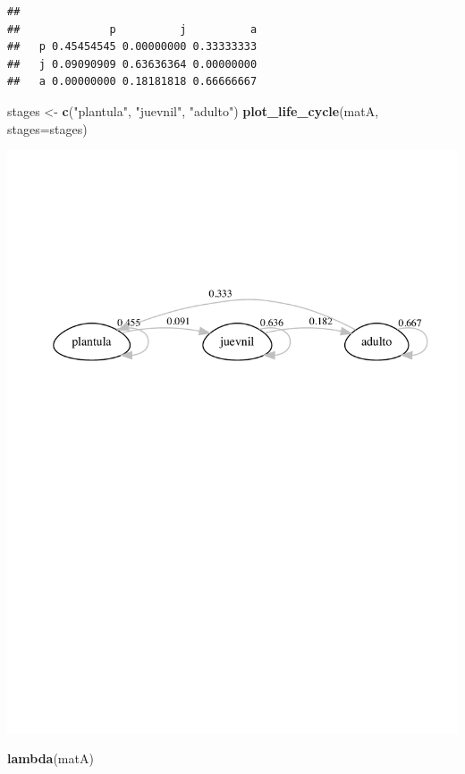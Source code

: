 \documentclass[
]{book}
\newenvironment{Shaded}{\begin{snugshade}}{\end{snugshade}}
\newcommand{\AttributeTok}[1]{\textcolor[rgb]{0.13,0.29,0.53}{#1}}
\newcommand{\FunctionTok}[1]{\textcolor[rgb]{0.13,0.29,0.53}{\textbf{#1}}}
\newcommand{\NormalTok}[1]{#1}
\newcommand{\OtherTok}[1]{\textcolor[rgb]{0.56,0.35,0.01}{#1}}
\newcommand{\StringTok}[1]{\textcolor[rgb]{0.31,0.60,0.02}{#1}}
\theoremstyle{definition}
\theoremstyle{definition}
\theoremstyle{definition}
\theoremstyle{definition}
\theoremstyle{remark}
\begin{document}
\begin{verbatim}
##    
##              p          j          a
##   p 0.45454545 0.00000000 0.33333333
##   j 0.09090909 0.63636364 0.00000000
##   a 0.00000000 0.18181818 0.66666667
\end{verbatim}

\begin{Shaded}
\begin{Highlighting}[]
\NormalTok{stages }\OtherTok{\textless{}{-}} \FunctionTok{c}\NormalTok{(}\StringTok{"plantula"}\NormalTok{, }\StringTok{"juevnil"}\NormalTok{, }\StringTok{"adulto"}\NormalTok{)}
\FunctionTok{plot\_life\_cycle}\NormalTok{(matA, }\AttributeTok{stages=}\NormalTok{stages)}
\end{Highlighting}
\end{Shaded}

\includegraphics{Diagnostico_Poblacional_files/figure-latex/unnamed-chunk-63-1.pdf}

\begin{Shaded}
\begin{Highlighting}[]
\FunctionTok{lambda}\NormalTok{(matA)}
\end{Highlighting}
\end{Shaded}
\end{document}
